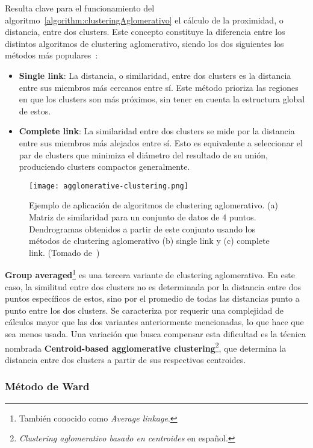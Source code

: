 Resulta clave para el funcionamiento del algoritmo~\ref{algorithm:clusteringAglomerativo} el cálculo de la proximidad, o distancia, entre dos clusters.
Este concepto constituye la diferencia entre los distintos algoritmos de clustering aglomerativo, siendo los dos siguientes los métodos más populares~\cite{Aggarawal13}:

\begin{itemize}
    \item \textbf{Single link}: La distancia, o similaridad, entre dos clusters es la distancia entre sus miembros más cercanos entre sí.
    Este método prioriza las regiones en que los clusters son más próximos, sin tener en cuenta la estructura global de estos.
    \item \textbf{Complete link}: La similaridad entre dos clusters se mide por la distancia entre sus miembros más alejados entre sí.
    Esto es equivalente a seleccionar el par de clusters que minimiza el diámetro del resultado de su unión, produciendo clusters compactos generalmente.
\end{itemize}

\begin{figure}[!h]
    \centering
    \texttt{[image: agglomerative-clustering.png]}
    \caption{Ejemplo de aplicación de algoritmos de clustering aglomerativo. (a) Matriz de similaridad para un conjunto de datos de 4 puntos.
    Dendrogramas obtenidos a partir de este conjunto usando los métodos de clustering aglomerativo (b) single link y (c) complete link. (Tomado de~\cite{Aggarawal13})}
\end{figure}

\textbf{Group averaged}\footnote{También conocido como \textit{Average linkage}.} es una tercera variante de clustering aglomerativo.
En este caso, la similitud entre dos clusters no es determinada por la distancia entre dos puntos específicos de estos, sino por el promedio de todas las distancias punto a punto entre los dos clusters.
Se caracteriza por requerir una complejidad de cálculos mayor que las dos variantes anteriormente mencionadas, lo que hace que sea menos usada.
Una variación que busca compensar esta dificultad es la técnica nombrada \textbf{Centroid-based agglomerative clustering}\footnote{\textit{Clustering aglomerativo basado en centroides} en español.}, que determina la distancia entre dos clusters a partir de sus respectivos centroides.

\subsubsection{Método de Ward}

